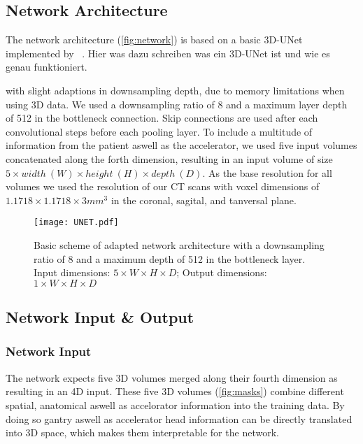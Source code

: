 \subsection{Network Architecture}

The network architecture (\autoref{fig:network}) is based on a basic 3D-UNet implemented by \citeauthor{ronneberger_u-net_2015-1}~\cite{ronneberger_u-net_2015-1}.
Hier was dazu schreiben was ein 3D-UNet ist und wie es genau funktioniert. 

with slight adaptions in downsampling depth, due to memory limitations when using 3D data. We used a downsampling ratio of 8 and a maximum layer depth of 512 in the bottleneck connection. Skip connections are used after each convolutional steps before each pooling layer. To include a multitude of information from the patient aswell as the accelerator, we used five input volumes concatenated along the forth dimension, resulting in an input volume of size $5 \times width \ (W) \times height \ (H) \times depth \ (D)$. As the base resolution for all volumes we used the resolution of our CT scans with voxel dimensions of $1.1718 \times 1.1718 \times 3 mm^3$ in the coronal, sagital, and tanversal plane. 


\begin{figure}
    \centering
    \texttt{[image: UNET.pdf]}
    \caption{Basic scheme of adapted network architecture with a downsampling ratio of 8 and a maximum depth of 512 in the bottleneck layer. Input dimensions: $5 \times W \times H \times D$; Output dimensions: $1 \times W \times H \times D$}\label{fig:network}
\end{figure}

\subsection{Network Input \& Output}

\subsubsection{Network Input}

The network expects five 3D volumes merged along their fourth dimension as resulting in an 4D input. 
These five 3D volumes (\autoref{fig:masks}) combine different spatial, anatomical aswell as accelorator information into the training data. 
By doing so gantry aswell as accelerator head information can be directly translated into 3D space, which makes them interpretable for the network. 

